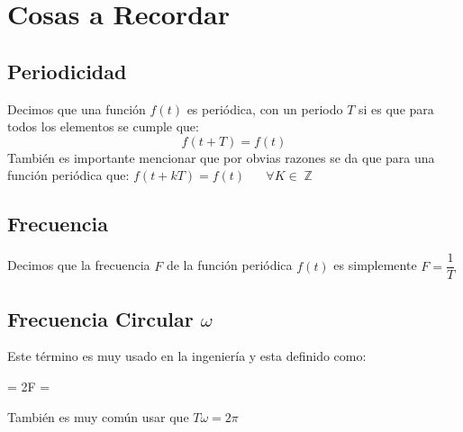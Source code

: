 \documentclass[12pt, fleqn]{report}                             %
\DeclareMathOperator \Space {\quad}                             %
\newenvironment{MultiLineEquation*}[1]                          %
        {\begin{equation*}\begin{alignedat}{#1}}                    %
        {\end{alignedat}\end{equation*}}                            %
\DeclareMathOperator \Integers  {\mathbb{Z}}                     %
\begin{document}
        \clearpage
        \section{Cosas a Recordar}


            \subsection*{Periodicidad}

                Decimos que una función $f(t)$ es periódica, con un periodo $T$ si es que para todos
                los elementos se cumple que:
                \begin{equation*}
                    f(t + T) = f(t)
                \end{equation*}
                También es importante mencionar que por obvias razones se da que para una función
                periódica que: $f(t + kT) = f(t) \Space \forall K \in \Integers$

            \subsection*{Frecuencia}

                Decimos que la frecuencia $F$ de la función periódica $f(t)$
                es simplemente $F = \dfrac{1}{T}$

            \subsection*{Frecuencia Circular $\omega$}

                Este término es muy usado en la ingeniería y esta definido como:
                \begin{MultiLineEquation*}{3}
                    \omega = 2\pi F = 
                \end{MultiLineEquation*}
                También es muy común usar que $T\omega = 2\pi$
                        
\end{document}

